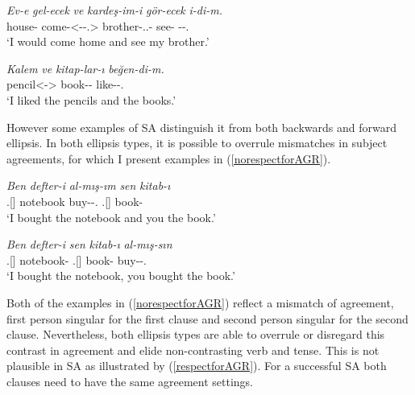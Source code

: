\begin{exe}
    \ex \label{SAbackwards}
    \begin{xlist}
        \ex
        \gll 
        \textit{Ev-e} \textit{gel-ecek} \textit{ve} \textit{kardeş-im-i} \textit{gör-ecek} \textit{i-di-m.} \\ house-{\Dat} come-{\Fut}{\textless {\Cop}-{\Pst}-{\First}.{\Sg}\textgreater} {\And} brother-{\Poss}.{\First}.{\Sg}-{\Acc} see-{\Fut} {\Cop}-{\Pst}-{\First}.{\Sg} \\
        \glt `I would come home and see my brother.'
        
        \ex
        \gll
        \textit{Kalem} \textit{ve} \textit{kitap-lar-ı} \textit{beğen-di-m.} \\ pencil{\textless {\Pl}-{\Acc}\textgreater} {\And} book-{\Pl}-{\Acc} like-{\Pst}-{\First}.{\Sg} \\
        \glt `I liked the pencils and the books.'
    \end{xlist}
\end{exe}

However some examples of SA distinguish it from both backwards and forward ellipsis. In both ellipsis types, it is possible to overrule mismatches in subject agreements, for which I present examples in (\ref{norespectforAGR}).

\begin{exe}
    \ex \label{norespectforAGR}
    \begin{xlist}
        \ex 
        \gll 
        \textit{Ben} \textit{defter-i} \textit{al-mış-ım} \textit{sen} \textit{kitab-ı} \\ {\First}.{\Sg}[{\Nom}] notebook buy-{\Prf}-{\First}.{\Sg} {\Second}.{\Sg}[{\Nom}] book-{\Acc} \\
        \glt `I bought the notebook and you the book.'
        
        \ex 
        \gll 
        \textit{Ben} \textit{defter-i} \textit{sen} \textit{kitab-ı} \textit{al-mış-sın} \\ {\First}.{\Sg}[{\Nom}] notebook-{\Acc} {\Second}.{\Sg}[{\Nom}] book-{\Acc} buy-{\Prf}-{\Second}.{\Sg} \\
        \glt `I bought the notebook, you bought the book.'
    \end{xlist}
\end{exe}

Both of the examples in (\ref{norespectforAGR}) reflect a mismatch of agreement, first person singular for the first clause and second person singular for the second clause. Nevertheless, both ellipsis types are able to overrule or disregard this contrast in agreement and elide non-contrasting verb and tense. This is not plausible in SA as illustrated by (\ref{respectforAGR}). For a successful SA both clauses need to have the same agreement settings.

